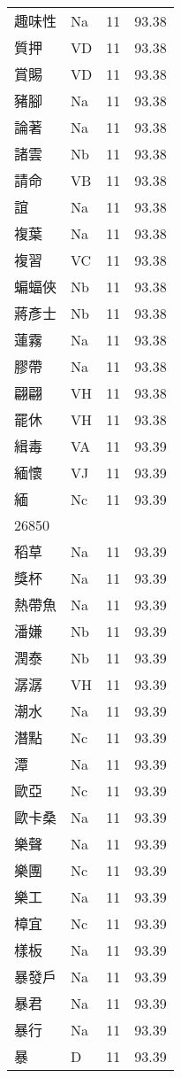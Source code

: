 \documentclass[twocolumn]{book}
\begin{document}
\begin{supertabular}{llrr}
趣味性 & Na & 11 &  93.38\\
質押 & VD & 11 &  93.38\\
賞賜 & VD & 11 &  93.38\\
豬腳 & Na & 11 &  93.38\\
論著 & Na & 11 &  93.38\\
諸雲 & Nb & 11 &  93.38\\
請命 & VB & 11 &  93.38\\
誼 & Na & 11 &  93.38\\
複葉 & Na & 11 &  93.38\\
複習 & VC & 11 &  93.38\\
蝙蝠俠 & Nb & 11 &  93.38\\
蔣彥士 & Nb & 11 &  93.38\\
蓮霧 & Na & 11 &  93.38\\
膠帶 & Na & 11 &  93.38\\
翩翩 & VH & 11 &  93.38\\
罷休 & VH & 11 &  93.38\\
緝毒 & VA & 11 &  93.39\\
緬懷 & VJ & 11 &  93.39\\
緬 & Nc & 11 &  93.39\\
26850\\
稻草 & Na & 11 &  93.39\\
獎杯 & Na & 11 &  93.39\\
熱帶魚 & Na & 11 &  93.39\\
潘嫌 & Nb & 11 &  93.39\\
潤泰 & Nb & 11 &  93.39\\
潺潺 & VH & 11 &  93.39\\
潮水 & Na & 11 &  93.39\\
潛點 & Nc & 11 &  93.39\\
潭 & Na & 11 &  93.39\\
歐亞 & Nc & 11 &  93.39\\
歐卡桑 & Na & 11 &  93.39\\
樂聲 & Na & 11 &  93.39\\
樂團 & Nc & 11 &  93.39\\
樂工 & Na & 11 &  93.39\\
樟宜 & Nc & 11 &  93.39\\
樣板 & Na & 11 &  93.39\\
暴發戶 & Na & 11 &  93.39\\
暴君 & Na & 11 &  93.39\\
暴行 & Na & 11 &  93.39\\
暴 & D & 11 &  93.39\\

\end{supertabular}
\end{document}
